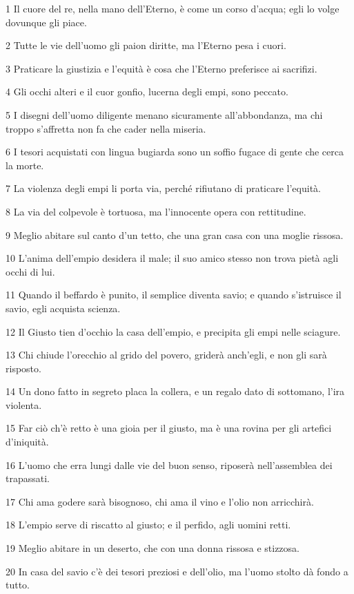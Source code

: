 \par 1 Il cuore del re, nella mano dell'Eterno, è come un corso d'acqua; egli lo volge dovunque gli piace.
\par 2 Tutte le vie dell'uomo gli paion diritte, ma l'Eterno pesa i cuori.
\par 3 Praticare la giustizia e l'equità è cosa che l'Eterno preferisce ai sacrifizi.
\par 4 Gli occhi alteri e il cuor gonfio, lucerna degli empi, sono peccato.
\par 5 I disegni dell'uomo diligente menano sicuramente all'abbondanza, ma chi troppo s'affretta non fa che cader nella miseria.
\par 6 I tesori acquistati con lingua bugiarda sono un soffio fugace di gente che cerca la morte.
\par 7 La violenza degli empi li porta via, perché rifiutano di praticare l'equità.
\par 8 La via del colpevole è tortuosa, ma l'innocente opera con rettitudine.
\par 9 Meglio abitare sul canto d'un tetto, che una gran casa con una moglie rissosa.
\par 10 L'anima dell'empio desidera il male; il suo amico stesso non trova pietà agli occhi di lui.
\par 11 Quando il beffardo è punito, il semplice diventa savio; e quando s'istruisce il savio, egli acquista scienza.
\par 12 Il Giusto tien d'occhio la casa dell'empio, e precipita gli empi nelle sciagure.
\par 13 Chi chiude l'orecchio al grido del povero, griderà anch'egli, e non gli sarà risposto.
\par 14 Un dono fatto in segreto placa la collera, e un regalo dato di sottomano, l'ira violenta.
\par 15 Far ciò ch'è retto è una gioia per il giusto, ma è una rovina per gli artefici d'iniquità.
\par 16 L'uomo che erra lungi dalle vie del buon senso, riposerà nell'assemblea dei trapassati.
\par 17 Chi ama godere sarà bisognoso, chi ama il vino e l'olio non arricchirà.
\par 18 L'empio serve di riscatto al giusto; e il perfido, agli uomini retti.
\par 19 Meglio abitare in un deserto, che con una donna rissosa e stizzosa.
\par 20 In casa del savio c'è dei tesori preziosi e dell'olio, ma l'uomo stolto dà fondo a tutto.
